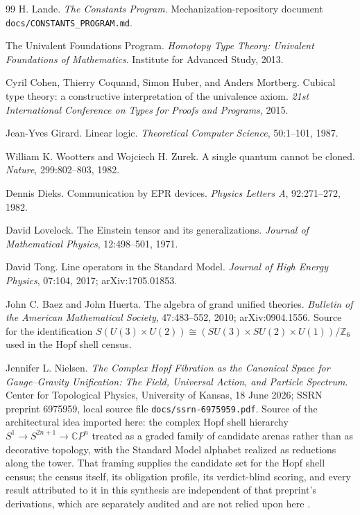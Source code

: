 \documentclass[11pt]{article}
\theoremstyle{plain}
\theoremstyle{definition}
\theoremstyle{remark}
\newcommand{\C}{\mathbb{C}}
\newcommand{\SM}{SU(3)\times SU(2)\times U(1)}
\begin{document}
\begin{thebibliography}{99}
H. Lande.
\newblock \emph{The Constants Program}.
\newblock Mechanization-repository document \texttt{docs/CONSTANTS\_PROGRAM.md}.

The Univalent Foundations Program.
\newblock \emph{Homotopy Type Theory: Univalent Foundations of Mathematics}.
\newblock Institute for Advanced Study, 2013.

Cyril Cohen, Thierry Coquand, Simon Huber, and Anders Mortberg.
\newblock Cubical type theory: a constructive interpretation of the univalence axiom.
\newblock \emph{21st International Conference on Types for Proofs and Programs}, 2015.

Jean-Yves Girard.
\newblock Linear logic.
\newblock \emph{Theoretical Computer Science}, 50:1--101, 1987.

William K. Wootters and Wojciech H. Zurek.
\newblock A single quantum cannot be cloned.
\newblock \emph{Nature}, 299:802--803, 1982.

Dennis Dieks.
\newblock Communication by EPR devices.
\newblock \emph{Physics Letters A}, 92:271--272, 1982.

David Lovelock.
\newblock The Einstein tensor and its generalizations.
\newblock \emph{Journal of Mathematical Physics}, 12:498--501, 1971.

David Tong.
\newblock Line operators in the Standard Model.
\newblock \emph{Journal of High Energy Physics}, 07:104, 2017; arXiv:1705.01853.

John C. Baez and John Huerta.
\newblock The algebra of grand unified theories.
\newblock \emph{Bulletin of the American Mathematical Society}, 47:483--552, 2010; arXiv:0904.1556. Source for the identification \(S(U(3)\times U(2))\cong(\SM)/\mathbb Z_6\) used in the Hopf shell census.

Jennifer L. Nielsen.
\newblock \emph{The Complex Hopf Fibration as the Canonical Space for Gauge--Gravity Unification: The Field, Universal Action, and Particle Spectrum}.
\newblock Center for Topological Physics, University of Kansas, 18 June 2026; SSRN preprint 6975959, local source file \texttt{docs/ssrn-6975959.pdf}. Source of the architectural idea imported here: the complex Hopf shell hierarchy \(S^1\to S^{2n+1}\to\C P^n\) treated as a graded family of candidate arenas rather than as decorative topology, with the Standard Model alphabet realized as reductions along the tower. That framing supplies the candidate set for the Hopf shell census; the census itself, its obligation profile, its verdict-blind scoring, and every result attributed to it in this synthesis are independent of that preprint's derivations, which are separately audited and are not relied upon here \cite{lande-hopf-audit}.


\end{thebibliography}
\end{document}
